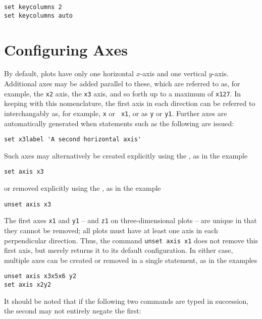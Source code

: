 \begin{verbatim}
set keycolumns 2
set keycolumns auto
\end{verbatim}

\section{Configuring Axes}
\label{sec:multiple_axes}

By default, plots have only one horizontal $x$-axis and one vertical $y$-axis.
Additional axes may be added parallel to these, which are referred to as, for
example, the {\tt x2} axis, the {\tt x3} axis, and so forth up to a maximum of
{\tt x127}.  In keeping with this nomenclature, the first axis in each
direction can be referred to interchangably as, for example, {\tt x} or {\tt
x1}, or as {\tt y} or {\tt y1}.  Further axes are automatically generated when
statements such as the following are issued:

\begin{verbatim}
set x3label 'A second horizontal axis'
\end{verbatim}

\noindent Such axes may alternatively be created explicitly using the
, as in the example

\begin{verbatim}
set axis x3
\end{verbatim}

\noindent or removed explicitly using the , as in the
example

\begin{verbatim}
unset axis x3
\end{verbatim}

\noindent The first axes {\tt x1} and {\tt y1} -- and {\tt z1} on
three-dimensional plots -- are unique in that they cannot be removed; all plots
must have at least one axis in each perpendicular direction.  Thus, the command
{\tt unset axis x1} does not remove this first axis, but merely returns it to
its default configuration. In either case, multiple axes can be created or
removed in a single statement, as in the examples

\begin{verbatim}
unset axis x3x5x6 y2
set axis x2y2
\end{verbatim}

It should be noted that if the following two commands are typed in succession,
the second may not entirely negate the first:

